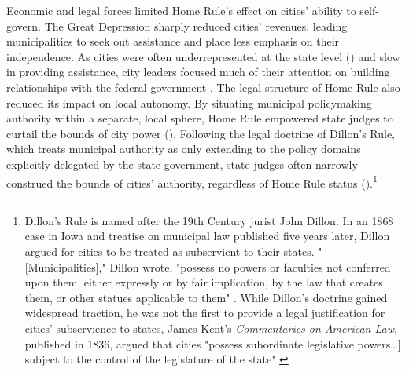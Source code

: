 \documentclass[12pt]{article}
\begin{document}
Economic and legal forces limited Home Rule's effect on cities' ability to self-govern. The Great Depression sharply reduced cities' revenues, leading municipalities to seek out assistance and place less emphasis on their independence. As cities were often underrepresented at the state level (\cites{ansolabehereEndInequalityOne2008}[p. 64-67]{bermanLocalGovernmentStates2003}) and slow in providing assistance, city leaders focused much of their attention on building relationships with the federal government \parencite[p. 64-65]{bermanLocalGovernmentStates2003}. The legal structure of Home Rule also reduced its impact on local autonomy. By situating municipal policymaking authority within a separate, local sphere, Home Rule empowered state judges to curtail the bounds of city power (\cites[p. 1125]{dillerIntrastatePreemption2007}[p. 12]{kraneHomeRuleAmerica2000}). Following the legal doctrine of Dillon's Rule, which treats municipal authority as only extending to the policy domains explicitly delegated by the state government, state judges often narrowly construed the bounds of cities' authority, regardless of Home Rule status (\cites[p. 1125]{dillerIntrastatePreemption2007}[p. 71-72]{bermanLocalGovernmentStates2003}).\footnote{Dillon's Rule is named after the 19th Century jurist John Dillon. In an 1868 case in Iowa and treatise on municipal law published five years later, Dillon argued for cities to be treated as subservient to their states. "[Municipalities]," Dillon wrote, "possess no powers or faculties not conferred upon them, either expressly or by fair implication, by the law that creates them, or other statues applicable to them" \parencite[p. 93]{dillonLawMunicipalCorporations1873}. While Dillon's doctrine gained widespread traction, he was not the first to provide a legal justification for cities' subservience to states, James Kent's \textit{Commentaries on American Law}, published in 1836, argued that cities "possess subordinate legislative powers\ldots] subject to the control of the legislature of the state" \parencite[Quoted in ][p. 9]{kraneHomeRuleAmerica2000}}
\end{document}
